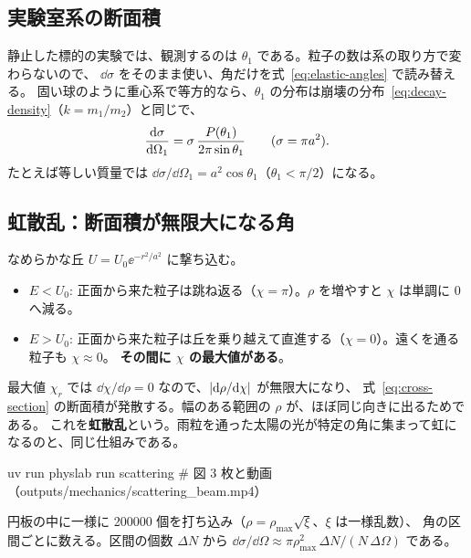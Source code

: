 \subsection{実験室系の断面積}

静止した標的の実験では、観測するのは $\theta_1$ である。粒子の数は系の取り方で変わらないので、
$\dd\sigma$ をそのまま使い、角だけを式~\eqref{eq:elastic-angles} で読み替える。
固い球のように重心系で等方的なら、$\theta_1$ の分布は崩壊の分布~\eqref{eq:decay-density}（$k=m_1/m_2$）と同じで、
\begin{equation}
  \frac{\mathrm{d} \sigma}{\mathrm{d} \Omega_1}=\sigma\,\frac{P(\theta_1)}{2\pi\sin\theta_1}\qquad(\sigma=\pi a^2).
\end{equation}
たとえば等しい質量では $\dd\sigma/\dd\Omega_1=a^2\cos\theta_1$（$\theta_1<\pi/2$）になる。


\subsection{虹散乱：断面積が無限大になる角}

なめらかな丘 $U=U_0\ee^{-r^2/a^2}$ に撃ち込む。
\begin{itemize}
  \item $E<U_0$: 正面から来た粒子は跳ね返る（$\chi=\pi$）。$\rho$ を増やすと $\chi$ は単調に 0 へ減る。
  \item $E>U_0$: 正面から来た粒子は丘を乗り越えて直進する（$\chi=0$）。遠くを通る粒子も $\chi\approx0$。
    \textbf{その間に $\chi$ の最大値がある}。
\end{itemize}
最大値 $\chi_r$ では $\dd\chi/\dd\rho=0$ なので、$\left\lvert \mathrm{d}\rho/\mathrm{d}\chi\right\rvert$ が無限大になり、
式~\eqref{eq:cross-section} の断面積が発散する。幅のある範囲の $\rho$ が、ほぼ同じ向きに出るためである。
これを\textbf{虹散乱}という。雨粒を通った太陽の光が特定の角に集まって虹になるのと、同じ仕組みである。


\begin{simbox}
\begin{terminal}
uv run physlab run scattering      # 図 3 枚と動画（outputs/mechanics/scattering_beam.mp4）
\end{terminal}
円板の中に一様に \num{200000} 個を打ち込み（$\rho=\rho_{\max}\sqrt{\xi}$、$\xi$ は一様乱数）、
角の区間ごとに数える。区間の個数 $\Delta N$ から
$\dd\sigma/\dd\Omega\approx\pi\rho_{\max}^2\,\Delta N/(N\,\Delta\Omega)$ である。
\end{simbox}

